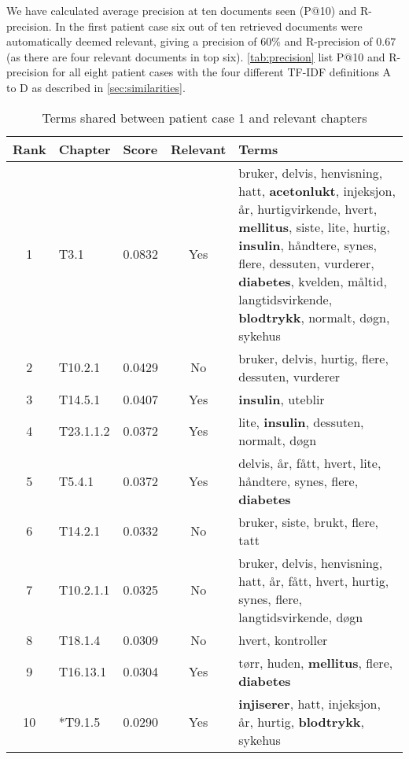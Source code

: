 \documentclass[a4paper, 11pt]{article}
\begin{document}
We have calculated average precision at ten documents seen (P@10) and
R-precision. In the first patient case six out of ten retrieved documents were
automatically deemed relevant, giving a precision of \( 60\% \) and
R-precision of \( 0.67 \) (as there are four relevant documents in top six).
\autoref{tab:precision} list P@10 and R-precision for all eight patient cases
with the four different TF-IDF definitions A to D as described in
\autoref{sec:similarities}.

\begin{table}[tbp] \footnotesize \center
\caption{Terms shared between patient case 1 and relevant chapters\label{tab:terms}}
\begin{tabularx}{\textwidth}{c l l c X}
    \toprule
    Rank & Chapter & Score & Relevant & Terms \\
    \midrule
	1 & T3.1 & 0.0832 & Yes & bruker, delvis, henvisning, hatt, \textbf{acetonlukt}, injeksjon, år, hurtigvirkende, hvert, \textbf{mellitus}, siste, lite, hurtig, \textbf{insulin}, håndtere, synes, flere, dessuten, vurderer, \textbf{diabetes}, kvelden, måltid, langtidsvirkende, \textbf{blodtrykk}, normalt, døgn, sykehus \\
	2 & T10.2.1 & 0.0429 & No & bruker, delvis, hurtig, flere, dessuten, vurderer \\
	3 & T14.5.1 & 0.0407 & Yes & \textbf{insulin}, uteblir \\
	4 & T23.1.1.2 & 0.0372 & Yes & lite, \textbf{insulin}, dessuten, normalt, døgn \\
	5 & T5.4.1 & 0.0372 & Yes & delvis, år, fått, hvert, lite, håndtere, synes, flere, \textbf{diabetes} \\
	6 & T14.2.1 & 0.0332 & No & bruker, siste, brukt, flere, tatt \\
	7 & T10.2.1.1 & 0.0325 & No & bruker, delvis, henvisning, hatt, år, fått, hvert, hurtig, synes, flere, langtidsvirkende, døgn \\
	8 & T18.1.4 & 0.0309 & No & hvert, kontroller \\
	9 & T16.13.1 & 0.0304 & Yes & tørr, huden, \textbf{mellitus}, flere, \textbf{diabetes} \\
	10 & *T9.1.5 & 0.0290 & Yes & \textbf{injiserer}, hatt, injeksjon, år, hurtig, \textbf{blodtrykk}, sykehus \\
	\bottomrule
\end{tabularx}
\end{table}
\end{document}
